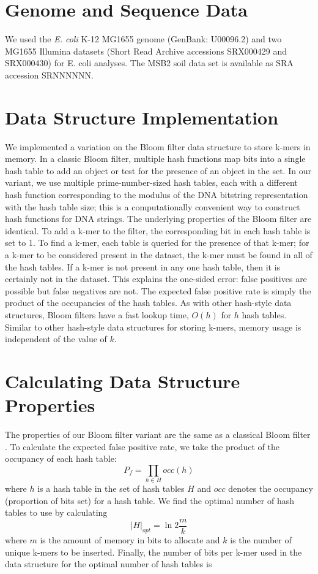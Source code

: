 \documentclass{pnastwo}
\begin{document}
\begin{article}
\begin{materials}

\section{Genome and Sequence Data}
We used the \emph{E. coli} K-12 MG1655 genome (GenBank: U00096.2) and two MG1655 Illumina 
datasets (Short Read Archive accessions SRX000429 and SRX000430) for E. coli
analyses.  The MSB2 soil data set is available as SRA accession SRNNNNNN.

\section{Data Structure Implementation}
We implemented a variation on the Bloom filter data structure to store
k-mers in memory. In a classic Bloom filter, multiple hash functions
map bits into a single hash table to add an object or test for the presence
of an object in the set. In our variant, we use multiple
prime-number-sized hash tables, each with a different hash
function corresponding to the modulus of the DNA bitstring
representation with the hash table size; this is a computationally convenient way to construct hash functions for DNA strings.  The underlying properties of
the Bloom filter are identical.  To add a k-mer to the
filter, the corresponding bit in each hash table is set to 1.  To find
a k-mer, each table is queried for the presence of
that k-mer; for a k-mer to be considered present in the dataset, the
k-mer must be found in all of the hash tables.  If a k-mer is not
present in any one hash table, then it is certainly not in the
dataset. This explains the one-sided error: false positives are
possible but false negatives are not. The expected false positive rate
is simply the product of the occupancies of the hash tables.  As with
other hash-style data structures, Bloom filters have a fast lookup
time, $O(h)$ for $h$ hash tables.  Similar to other hash-style data
structures for storing k-mers, memory usage is independent of the
value of $k$.

\section{Calculating Data Structure Properties}
The properties of our Bloom filter variant are the
same as a classical Bloom filter \cite{bloomsurvey}.
To calculate the expected false positive 
rate, we
take the product of the occupancy of each hash table:
\begin{displaymath}
P_f = \prod_{h \in H} occ(h)
\end{displaymath}
where $h$ is a hash table in the set of hash tables $H$ and $occ$ denotes
the occupancy (proportion of bits set) for a hash table.
We find the optimal number of hash tables
to use by calculating
\begin{displaymath}
\vert H \vert_{opt} = \ln 2 \frac{m}{k}
\end{displaymath}
where $m$ is the amount of memory in bits to allocate and $k$
is the number of unique k-mers to be inserted. Finally,
the number of bits per
k-mer used in the data structure for the optimal number of hash 
tables is


\end{materials}
\end{article}
\end{document}
